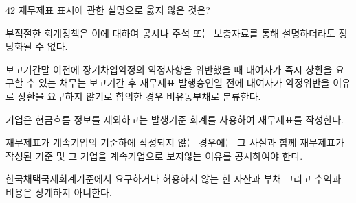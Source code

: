 \begin{question}{42}
재무제표 표시에 관한 설명으로 옳지 않은 것은?
\begin{choices}
  \item 부적절한 회계정책은 이에 대하여 공시나 주석 또는 보충자료를 통해 설명하더라도 정당화될 수 없다.
  \item 보고기간말 이전에 장기차입약정의 약정사항을 위반했을 때 대여자가 즉시 상환을 요구할 수 있는 채무는 보고기간 후 재무제표 발행승인일 전에 대여자가 약정위반을 이유로 상환을 요구하지 않기로 합의한 경우 비유동부채로 분류한다.
  \item 기업은 현금흐름 정보를 제외하고는 발생기준 회계를 사용하여 재무제표를 작성한다.
  \item 재무제표가 계속기업의 기준하에 작성되지 않는 경우에는 그 사실과 함께 재무제표가 작성된 기준 및 그 기업을 계속기업으로 보지않는 이유를 공시하여야 한다.
  \item 한국채택국제회계기준에서 요구하거나 허용하지 않는 한 자산과 부채 그리고 수익과 비용은 상계하지 아니한다.
\end{choices}
\end{question}
